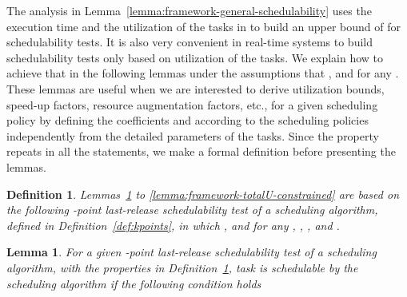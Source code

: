 \documentclass[10pt,conference]{IEEEtran}
\newtheorem{lemma}{Lemma}
\newtheorem{definition}{Definition}
\begin{document}
The analysis in Lemma~\ref{lemma:framework-general-schedulability} uses the execution time and the utilization of the tasks in  to build an upper bound of  for  schedulability tests. It is also very convenient in real-time systems to build schedulability tests only based on utilization of the tasks. We explain how to achieve that in the following lemmas under the assumptions that , and  for any . 
These lemmas are useful when we are interested to derive utilization bounds, speed-up factors, resource augmentation factors, etc., for a given scheduling policy by defining the coefficients  and  according to the scheduling policies independently from the detailed parameters of the tasks. 
 Since the property repeats in all the statements, we make a formal definition before presenting the lemmas.
\begin{definition}
  \label{def:alpha-upper-bound}
  Lemmas~\ref{lemma:framework-constrained-schedulability} to
  \ref{lemma:framework-totalU-constrained} are based on the
  following -point last-release schedulability test of a scheduling
  algorithm, defined in Definition~\ref{def:kpoints}, in which , and  for
  any , , , and .
\end{definition}

\begin{lemma}
\label{lemma:framework-constrained-schedulability}
For a given -point last-release schedulability test of a scheduling 
algorithm, with the properties in Definition~\ref{def:alpha-upper-bound}, 
task  is schedulable by the scheduling
algorithm if the following condition holds
{\small }
\end{lemma}
\end{document}
